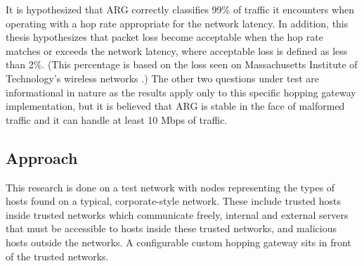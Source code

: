 

\par It is hypothesized that \ac{ARG} correctly classifies 99\% of traffic it encounters when operating with a hop rate appropriate for the network latency. In addition, this thesis hypothesizes that packet loss become acceptable when the hop rate matches or exceeds the network latency, where acceptable loss is defined as less than 2\%. (This percentage is based on the loss seen on Massachusetts Institute of Technology's wireless networks \cite{MITWifiLoss}.) The other two questions under test are informational in nature as the results apply only to this specific hopping gateway implementation, but it is believed that \ac{ARG} is stable in the face of malformed traffic and it can handle at least 10 \ac{Mbps} of traffic. 

\subsection{Approach}
\label{sec:approach}
\par This research is done on a test network with nodes representing the types of hosts found on a typical, corporate-style network. These include trusted hosts inside trusted networks which communicate freely, internal and external servers that must be accessible to hosts inside these trusted networks, and malicious hosts outside the networks. A configurable custom hopping gateway sits in front of the trusted networks. 

